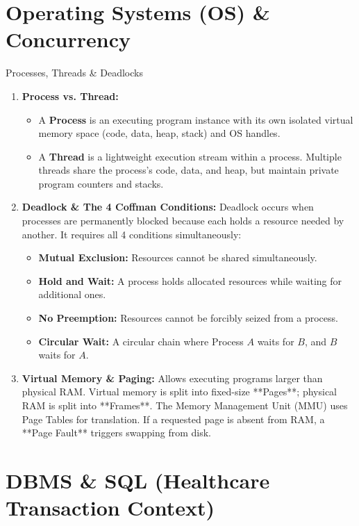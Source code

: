 \documentclass[11pt,a4paper]{article}
\begin{document}
\section{Operating Systems (OS) \& Concurrency}

\begin{techbox}{Processes, Threads \& Deadlocks}
\begin{enumerate}
    \item \textbf{Process vs. Thread:}
    \begin{itemize}
        \item A \textbf{Process} is an executing program instance with its own isolated virtual memory space (code, data, heap, stack) and OS handles.
        \item A \textbf{Thread} is a lightweight execution stream within a process. Multiple threads share the process's code, data, and heap, but maintain private program counters and stacks.
    \end{itemize}
    \item \textbf{Deadlock \& The 4 Coffman Conditions:}
    Deadlock occurs when processes are permanently blocked because each holds a resource needed by another. It requires all 4 conditions simultaneously:
    \begin{itemize}
        \item \textbf{Mutual Exclusion:} Resources cannot be shared simultaneously.
        \item \textbf{Hold and Wait:} A process holds allocated resources while waiting for additional ones.
        \item \textbf{No Preemption:} Resources cannot be forcibly seized from a process.
        \item \textbf{Circular Wait:} A circular chain where Process $A$ waits for $B$, and $B$ waits for $A$.
    \end{itemize}
    \item \textbf{Virtual Memory \& Paging:}
    Allows executing programs larger than physical RAM. Virtual memory is split into fixed-size **Pages**; physical RAM is split into **Frames**. The Memory Management Unit (MMU) uses Page Tables for translation. If a requested page is absent from RAM, a **Page Fault** triggers swapping from disk.
\end{enumerate}
\end{techbox}

\section{DBMS \& SQL (Healthcare Transaction Context)}
\end{document}
